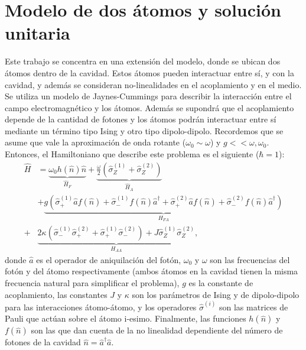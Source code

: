 


\section{Modelo de dos átomos y solución unitaria}
Este trabajo se concentra en una extensión del modelo, donde se ubican dos átomos dentro de la cavidad. Estos átomos pueden interactuar entre sí, y con la cavidad, y además se consideran no-linealidades en el acoplamiento y en el medio.
Se utiliza un modelo de Jaynes-Cummings para describir la interacci\'on entre el campo electromagn\'etico y los átomos. Adem\'as se supondrá que el acoplamiento depende de la cantidad de fotones y los átomos podr\'an interactuar entre sí mediante un término tipo Ising y otro tipo dipolo-dipolo. Recordemos que se asume que vale la aproximaci\'on de onda rotante ($\omega_0 \sim \omega$) y $g << \omega,\omega_0$.
Entonces, el Hamiltoniano que describe este problema es el siguiente ($\hbar=1$):
\begin{equation}
\begin{split}
     \hat H & =\underbrace{ \omega_0 h(\hat n) \hat n }_{\hat H_F}+\underbrace{\frac{ \omega}{2}(\hat\sigma_Z^{(1)}+\hat\sigma_Z^{(2)})}_{\hat H_A}   \\ 
     & + \underbrace{ g(\hat\sigma_+^{(1)}\hat a f(\hat n)+\hat\sigma_-^{(1)}f(\hat n) \hat a^\dagger + \hat\sigma_+^{(2)}\hat a f(\hat n)+\hat\sigma_-^{(2)}f(\hat n) \hat a^\dagger)}_{H_{FA}} \\ +& \underbrace{2 \kappa (\hat \sigma_-^{(1)}\hat \sigma_+^{(2)}+\hat \sigma_+^{(1)}\hat \sigma_-^{(2)}) +  J \hat \sigma_Z^{(1)}\hat \sigma_Z^{(2)}}_{H_{AA}},
\end{split}
\end{equation}
donde $\hat a$ es el operador de aniquilaci\'on del fot\'on, $\omega_0$ y $\omega$ son las frecuencias del fot\'on y del átomo respectivamente (ambos átomos en la cavidad tienen la misma frecuencia natural para simplificar el problema), $g$ es la constante de acoplamiento, las constantes $J$ y $\kappa$ son los par\'ametros de Ising y de dipolo-dipolo para las interacciones átomo-átomo, y los operadores $\hat \sigma^{(i)}$ son las matrices de Pauli que act\'uan sobre el átomo i-esimo. Finalmente, las funciones $h(\hat n)$ y $f(\hat n)$ son las que dan cuenta de la no linealidad dependiente del número de fotones de la cavidad $\hat n = \hat a^\dagger \hat a$. 


